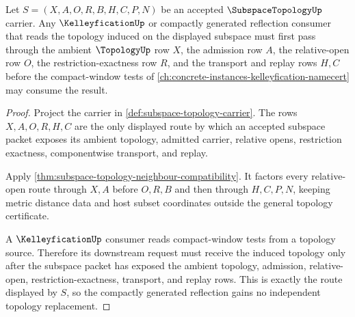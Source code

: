 \begin{theorem}
\label{thm:subspace-topology-downstream-kelleyfication-route}
Let $S=(X,A,O,R,B,H,C,P,N)$ be an accepted $\SubspaceTopologyUp$ carrier. Any $\KelleyficationUp$ or compactly generated reflection consumer that reads the topology induced on the displayed subspace must first pass through the ambient $\TopologyUp$ row $X$, the admission row $A$, the relative-open row $O$, the restriction-exactness row $R$, and the transport and replay rows $H,C$ before the compact-window tests of \autoref{ch:concrete-instances-kelleyfication-namecert} may consume the result.
\end{theorem}
\begin{proof}
Project the carrier in \autoref{def:subspace-topology-carrier}. The rows $X,A,O,R,H,C$ are the only displayed route by which an accepted subspace packet exposes its ambient topology, admitted carrier, relative opens, restriction exactness, componentwise transport, and replay.

Apply \autoref{thm:subspace-topology-neighbour-compatibility}. It factors every relative-open route through $X,A$ before $O,R,B$ and then through $H,C,P,N$, keeping metric distance data and host subset coordinates outside the general topology certificate.

A $\KelleyficationUp$ consumer reads compact-window tests from a topology source. Therefore its downstream request must receive the induced topology only after the subspace packet has exposed the ambient topology, admission, relative-open, restriction-exactness, transport, and replay rows. This is exactly the route displayed by $S$, so the compactly generated reflection gains no independent topology replacement.
\end{proof}

